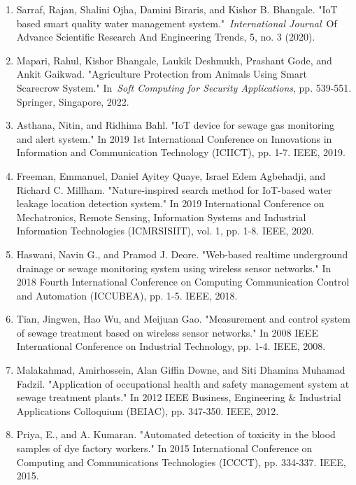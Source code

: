 \documentclass[12pt,a4paper]{report}
\begin{document}
\begin{enumerate}
\item  Sarraf, Rajan, Shalini Ojha, Damini Biraris, and Kishor B. Bhangale. "IoT based smart quality water management system."~\textit{International Journal}~Of Advance Scientific Research And Engineering Trends, 5, no. 3 (2020).

\item  Mapari, Rahul, Kishor Bhangale, Laukik Deshmukh, Prashant Gode, and Ankit Gaikwad. "Agriculture Protection from Animals Using Smart Scarecrow System." In~\textit{Soft Computing for Security Applications}, pp. 539-551. Springer, Singapore, 2022. 

\item  Asthana, Nitin, and Ridhima Bahl. "IoT device for sewage gas monitoring and alert system." In 2019 1st International Conference on Innovations in Information and Communication Technology (ICIICT), pp. 1-7. IEEE, 2019. 

\item  Freeman, Emmanuel, Daniel Ayitey Quaye, Israel Edem Agbehadji, and Richard C. Millham. "Nature-inspired search method for IoT-based water leakage location detection system." In 2019 International Conference on Mechatronics, Remote Sensing, Information Systems and Industrial Information Technologies (ICMRSISIIT), vol. 1, pp. 1-8. IEEE, 2020.

\item  Haswani, Navin G., and Pramod J. Deore. "Web-based realtime underground drainage or sewage monitoring system using wireless sensor networks." In 2018 Fourth International Conference on Computing Communication Control and Automation (ICCUBEA), pp. 1-5. IEEE, 2018.

\item  Tian, Jingwen, Hao Wu, and Meijuan Gao. "Measurement and control system of sewage treatment based on wireless sensor networks." In 2008 IEEE International Conference on Industrial Technology, pp. 1-4. IEEE, 2008.

\item  Malakahmad, Amirhossein, Alan Giffin Downe, and Siti Dhamina Muhamad Fadzil. "Application of occupational health and safety management system at sewage treatment plants." In 2012 IEEE Business, Engineering \& Industrial Applications Colloquium (BEIAC), pp. 347-350. IEEE, 2012.

\item  Priya, E., and A. Kumaran. "Automated detection of toxicity in the blood samples of dye factory workers." In 2015 International Conference on Computing and Communications Technologies (ICCCT), pp. 334-337. IEEE, 2015.


\end{enumerate}
\end{document}
